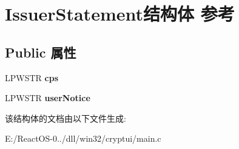 \hypertarget{struct_issuer_statement}{}\section{Issuer\+Statement结构体 参考}
\label{struct_issuer_statement}
\subsection*{Public 属性}
\begin{DoxyCompactItemize}
\item 
\mbox{\label{struct_issuer_statement_aa1ec86e841f486eecf5c7763c97c9e51}} 
L\+P\+W\+S\+TR {\bfseries cps}
\item 
\mbox{\label{struct_issuer_statement_adadbdfdf43965cca0f51566cce7dfb06}} 
L\+P\+W\+S\+TR {\bfseries user\+Notice}
\end{DoxyCompactItemize}


该结构体的文档由以下文件生成\+:\begin{DoxyCompactItemize}
\item 
E\+:/\+React\+O\+S-\/0../dll/win32/cryptui/main.\+c\end{DoxyCompactItemize}
